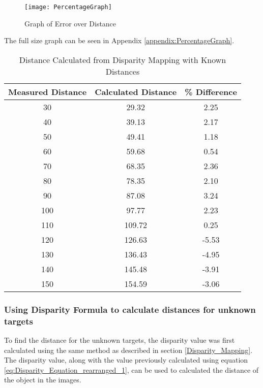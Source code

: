 \documentclass[conference]{IEEEtran}
\begin{document}
\begin{figure}[H]
\centerline{\texttt{[image: PercentageGraph]}}
\caption{Graph of Error over Distance}
\label{fig:PercentageGraph}
\end{figure}

The full size graph can be seen in Appendix \ref{appendix:PercentageGraph}.

\begin{table}
\begin{center}
\caption{Distance Calculated from Disparity Mapping with Known Distances}
\begin{tabular}{ || c || c || c || }
\hline
 Measured Distance & Calculated Distance & \% Difference\\ 
\hline
 30 & 29.32 & 2.25 \\  
\hline
 40 & 39.13 & 2.17 \\  
\hline
 50 & 49.41 & 1.18 \\  
\hline
 60 & 59.68 & 0.54 \\  
\hline
 70 & 68.35 & 2.36 \\  
\hline
 80 & 78.35 & 2.10 \\  
\hline
 90 & 87.08 & 3.24 \\  
\hline
 100 & 97.77 & 2.23 \\  
\hline
 110 & 109.72 & 0.25 \\  
\hline
 120 & 126.63 & -5.53 \\  
\hline
 130 & 136.43 & -4.95 \\  
\hline
 140 & 145.48 & -3.91 \\  
\hline
 150 & 154.59 & -3.06 \\  
\hline

\end{tabular}
\label{table:distance_values_for_known_values}
\end{center}
\end{table}

\subsubsection{Using Disparity Formula to calculate distances for unknown targets} 
To find the distance for the unknown targets, the disparity value was first calculated using the same method as described in section \ref{Disparity_Mapping}. The disparity value, along with the value previously calculated using equation \ref{eq:Disparity_Equation_rearranged_1}, can be used to calculated the distance of the object in the images. 
\end{document}
